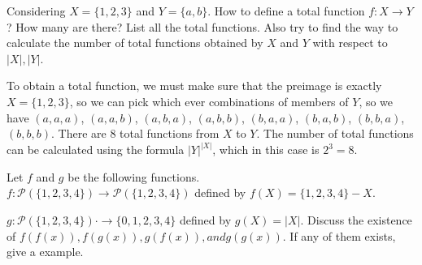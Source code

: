 \begin{exercise}
	Considering $X=\{1,2,3\}$ and $Y=\{a,b\}$. How to define a total function $f: X\to Y$?
	How many are there? List all the total functions. Also try to find the way to calculate
	the number of total functions obtained by $X$ and $Y$ with respect to $|X|, |Y|$.
\end{exercise}
\begin{solution}
	To obtain a total function, we must make sure that the preimage is exactly $X=\{1,2,3\}$, so we can pick which ever combinations of members of $Y$, so we have
	$(a, a, a)$,
	$(a, a, b)$,
	$(a, b, a)$,
	$(a, b, b)$,
	$(b, a, a)$,
	$(b, a, b)$,
	$(b, b, a)$,
	$(b, b, b)$.
	There are 8 total functions from $X$ to $Y$.
	 The number of total functions can be calculated using the formula $|Y|^{|X|}$, which in this case is $2^3 = 8$.
\end{solution}
\begin{exercise}
	Let $f$ and $g$ be the following functions.\\ $f:\mathcal{P}(\{1,2,3,4\})\to\mathcal{P}(\{1,2,3,4\})$ defined by $f(X)=\{1,2,3,4\}-X$.
	
	\noindent $g:\mathcal{P}(\{1,2,3,4\})\cdot\to\{0,1,2,3,4\}$ defined by $g(X)=|X|$.
	Discuss the existence of $f(f(x)), f(g(x)), g(f(x)), and g(g(x))$. If any
	of them exists, give a example.
\end{exercise}
